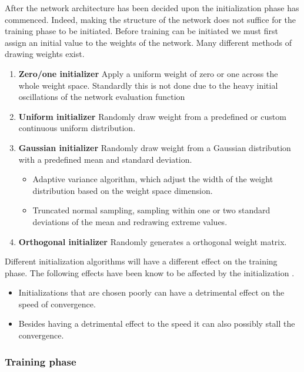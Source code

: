 \documentclass[12pt]{article}
\begin{document}
After the network architecture has been decided upon the initialization phase has commenced. Indeed, making the structure of the network does not suffice for the training phase to be initiated. Before training can be initiated we must first assign an initial value to the weights of the network. Many different methods of drawing weights exist.
\begin{enumerate}
	\item \textbf{Zero/one initializer} Apply a uniform weight of zero or one across the whole weight space. Standardly this is not done due to the heavy initial oscillations of the network evaluation function
	\item \textbf{Uniform initializer} Randomly draw weight from a predefined or custom continuous uniform distribution.
	\item \textbf{Gaussian initializer} Randomly draw weight from a Gaussian distribution with a predefined mean and standard deviation.
	\begin{itemize}
		\item Adaptive variance algorithm, which adjust the width of the weight distribution based on the weight space dimension.
		\item Truncated normal sampling, sampling within one or two standard deviations of the mean and redrawing extreme values.
	\end{itemize} 
	\item \textbf{Orthogonal initializer} Randomly generates a orthogonal weight matrix. 
\end{enumerate}
Different initialization algorithms will have a different effect on the training phase. The following effects have been know to be affected by the initialization \cite{Sutskever2013, Kumar}.
\begin{itemize}
	\item Initializations that are chosen poorly can have a detrimental effect on the speed of convergence.
	\item Besides having a detrimental effect to the speed it can also possibly stall the convergence.
\end{itemize}

\subsubsection{Training phase}
\end{document}
